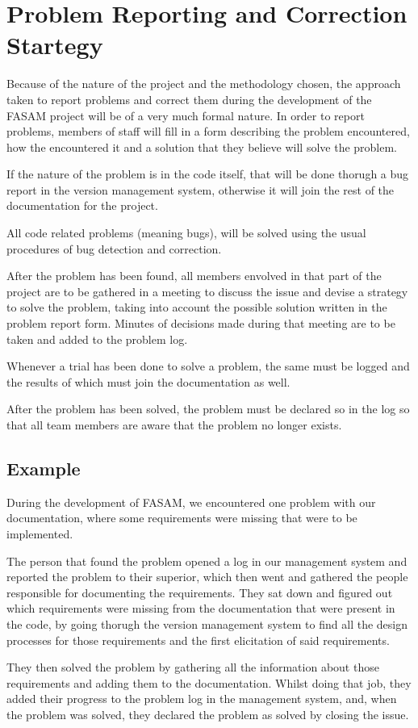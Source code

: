 \chapter{Problem Reporting and Correction Startegy}
Because of the nature of the project and the methodology chosen, the approach taken to report problems and correct them during the development of the FASAM project will be of a very much formal nature. In order to report problems, members of staff will fill in a form describing the problem encountered, how the encountered it and a solution that they believe will solve the problem.

If the nature of the problem is in the code itself, that will be done thorugh a bug report in the version management system, otherwise it will join the rest of the documentation for the project.

All code related problems (meaning bugs), will be solved using the usual procedures of bug detection and correction.

After the problem has been found, all members envolved in that part of the project are to be gathered in a meeting to discuss the issue and devise a strategy to solve the problem, taking into account the possible solution written in the problem report form. Minutes of decisions made during that meeting are to be taken and added to the problem log.

Whenever a trial has been done to solve a problem, the same must be logged and the results of which must join the documentation as well.

After the problem has been solved, the problem must be declared so in the log so that all team members are aware that the problem no longer exists.

\section{Example}
During the development of FASAM, we encountered one problem with our documentation, where some requirements were missing that were to be implemented.

The person that found the problem opened a log in our management system and reported the problem to their superior, which then went and gathered the people responsible for documenting the requirements. They sat down and figured out which requirements were missing from the documentation that were present in the code, by going thorugh the version management system to find all the design processes for those requirements and the first elicitation of said requirements.

They then solved the problem by gathering all the information about those requirements and adding them to the documentation. Whilst doing that job, they added their progress to the problem log in the management system, and, when the problem was solved, they declared the problem as solved by closing the issue.